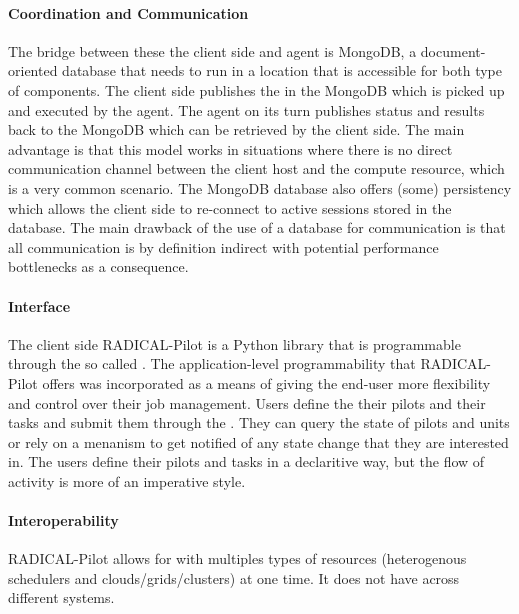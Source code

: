 \documentclass{sig-alternate}
\begin{document}
\paragraph{Coordination and Communication}

The bridge between these the client side and agent is MongoDB, a
document-oriented database that needs to run in a location that is accessible
for both type of components.
The client side publishes the  in the MongoDB which is picked
up and executed by the agent.
The agent on its turn publishes  status and results back
to the MongoDB which can be retrieved by the client side.
The main advantage is that this model works in situations where there is no
direct communication channel between the client host and the compute resource,
which is a very common scenario.
The MongoDB database also offers (some) persistency which allows the client
side to re-connect to active sessions stored in the database.
The main drawback of the use of a database for communication is that all
communication is by definition indirect with potential performance bottlenecks
as a consequence.

\paragraph{Interface}

The client side RADICAL-Pilot is a Python library that is programmable through
the so called .
The application-level programmability that RADICAL-Pilot offers was
incorporated as a means of giving the end-user more flexibility and control
over their job management.
Users define the their pilots and their tasks and submit them through the
.
They can query the state of pilots and units or rely on a 
menanism to get notified of any state change that they are interested in.
The users define their pilots and tasks in a declaritive way, but the flow of
activity is more of an imperative style.

\paragraph{Interoperability}

RADICAL-Pilot allows for  with multiples types of
resources (heterogenous schedulers and clouds/grids/clusters) at one time.
It does not have  across different \pilot systems.
\end{document}
